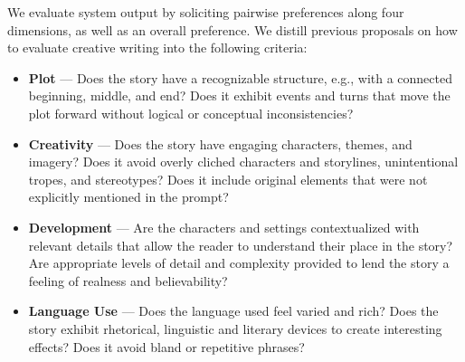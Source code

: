 \documentclass{article}
\newcommand{\fantine}[1]{{\textcolor{blue}{\bf{Fantine:} \emph{#1}}}}
\begin{document}
We evaluate system output by soliciting pairwise preferences \citep{Louviere1990} along four dimensions, as well as an overall preference. We distill previous proposals  \citep{chakrabarty:ea:2024b,chhun-etal-2022-human} on how to  evaluate creative writing into the following criteria: 
\begin{itemize}

\item \textbf{Plot} --- Does the story have a recognizable structure, e.g., with a connected beginning, middle, and end? Does it exhibit  events and turns that move the plot forward without logical or conceptual inconsistencies?

\item \textbf{Creativity} --- Does the story have engaging characters, themes, and imagery?   Does it avoid overly cliched characters and storylines, unintentional tropes, and stereotypes? Does it include  original elements that were not explicitly mentioned in the prompt? 

\item \textbf{Development} --- Are the characters and settings contextualized with relevant details that allow the reader to understand their place in the story? Are appropriate levels of detail and complexity provided to lend the story a feeling of realness and believability? 

\item \textbf{Language Use} ---  Does the language used feel varied and rich? Does the story exhibit rhetorical, linguistic and literary devices  to create interesting effects? Does it avoid  bland or repetitive phrases? 

\end{itemize}

\end{document}
